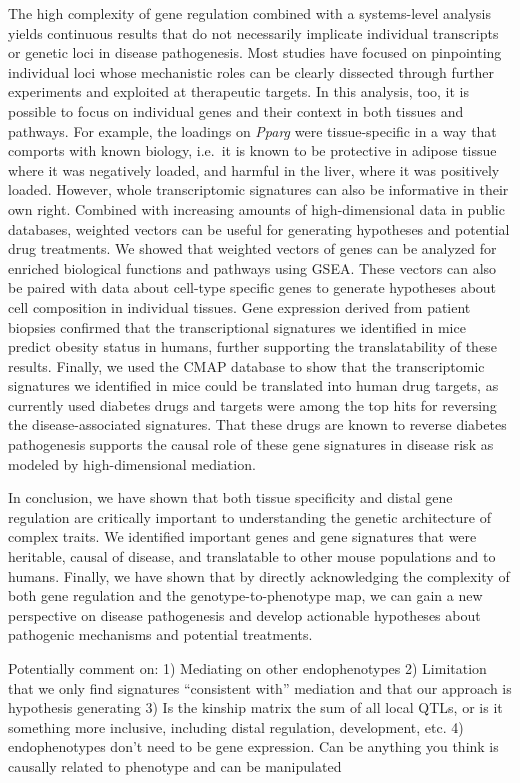 \documentclass[
]{article}
\begin{document}
The high complexity of gene regulation combined with a systems-level
analysis yields continuous results that do not necessarily implicate
individual transcripts or genetic loci in disease pathogenesis. Most
studies have focused on pinpointing individual loci whose mechanistic
roles can be clearly dissected through further experiments and exploited
at therapeutic targets. In this analysis, too, it is possible to focus
on individual genes and their context in both tissues and pathways. For
example, the loadings on \textit{Pparg} were tissue-specific in a way
that comports with known biology, i.e.~it is known to be protective in
adipose tissue where it was negatively loaded, and harmful in the liver,
where it was positively loaded. However, whole transcriptomic signatures
can also be informative in their own right. Combined with increasing
amounts of high-dimensional data in public databases, weighted vectors
can be useful for generating hypotheses and potential drug treatments.
We showed that weighted vectors of genes can be analyzed for enriched
biological functions and pathways using GSEA. These vectors can also be
paired with data about cell-type specific genes to generate hypotheses
about cell composition in individual tissues. Gene expression derived
from patient biopsies confirmed that the transcriptional signatures we
identified in mice predict obesity status in humans, further supporting
the translatability of these results. Finally, we used the CMAP database
to show that the transcriptomic signatures we identified in mice could
be translated into human drug targets, as currently used diabetes drugs
and targets were among the top hits for reversing the disease-associated
signatures. That these drugs are known to reverse diabetes pathogenesis
supports the causal role of these gene signatures in disease risk as
modeled by high-dimensional mediation.

In conclusion, we have shown that both tissue specificity and distal
gene regulation are critically important to understanding the genetic
architecture of complex traits. We identified important genes and gene
signatures that were heritable, causal of disease, and translatable to
other mouse populations and to humans. Finally, we have shown that by
directly acknowledging the complexity of both gene regulation and the
genotype-to-phenotype map, we can gain a new perspective on disease
pathogenesis and develop actionable hypotheses about pathogenic
mechanisms and potential treatments.

Potentially comment on: 1) Mediating on other endophenotypes 2)
Limitation that we only find signatures ``consistent with'' mediation
and that our approach is hypothesis generating 3) Is the kinship matrix
the sum of all local QTLs, or is it something more inclusive, including
distal regulation, development, etc. 4) endophenotypes don't need to be
gene expression. Can be anything you think is causally related to
phenotype and can be manipulated
\end{document}
